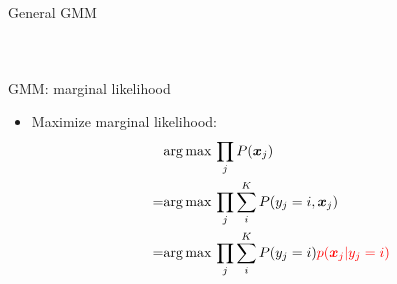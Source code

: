\documentclass[11.5pt]{beamer}
\newcommand{\argmax}[1]{\underset{#1}{\operatorname*{arg\,max\,}}}
\begin{document}
\begin{frame}{General GMM}
\begin{columns}[c]
\column{6cm}
\begin{figure}
\end{figure}
\end{columns}
\end{frame}

\begin{frame}{GMM: marginal likelihood}
\begin{itemize}
	\item Maximize marginal likelihood:
	\begin{equation} \nonumber
	\begin{aligned}
	&\argmax{} \prod_{j} P(\bm{x}_j) \\
	=&\argmax{} \prod_{j}\sum_{i}^{K}P(y_j=i,\bm{x}_j) \\
	=&\argmax{} \prod_{j}\sum_{i}^{K}P(y_j=i)\textcolor{red}{p(\bm{x}_j|y_j=i)}
	\end{aligned}
	\end{equation}
\end{itemize}
\end{frame}
\end{document}

